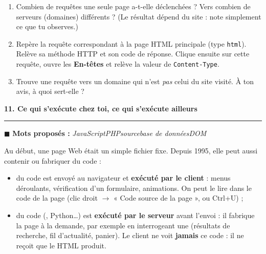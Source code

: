 \documentclass[11pt,a4paper]{article}
\newif\ifprof
\newcommand{\sect}[1]{%
  \par\addvspace{10pt}%
  {\color{navy}\Large\bfseries #1\par}\vspace{3pt}%
  {\color{navy}\hrule height 0.6pt}\vspace{6pt}}
\newcommand{\trou}[2][3cm]{\ifprof\textcolor{corr}{\underline{\textbf{\,#2\,}}}\else\underline{\hspace{#1}}\fi}
\newcommand{\lignes}[1]{\par\foreach \i in {1,...,#1}{\vspace{8.5mm}\hrule height 0.3pt}\vspace{2mm}}
\newcommand{\reponse}[2]{\ifprof\par{\raggedright\textcolor{corr}{#2}\par}\else\lignes{#1}\fi}
\newcommand{\motsproposes}[1]{\begin{mots}\small\textcolor{orangeT}{$\blacksquare$ \textbf{Mots proposés :}} \textit{#1}\end{mots}}
\newcommand{\ensei}[1]{\ifprof\begin{tcolorbox}[enhanced,colback=gris,colframe=corr!60,boxrule=0.5pt,arc=2pt,
  left=5pt,right=5pt,top=3pt,bottom=3pt,before skip=6pt,after skip=6pt,fontupper=\small]
  \textcolor{corr}{\textbf{Note enseignant.}} #1\end{tcolorbox}\fi}
\begin{document}
\begin{enumerate}[leftmargin=*,label=\alph*)]
\item Combien de requêtes une seule page a-t-elle déclenchées ? Vers combien de serveurs (domaines) différents ? (Le résultat dépend du site : note simplement ce que tu observes.)
\reponse{1}{Résultat variable. Ordre de grandeur : de 20 à 200 requêtes, de 3 à 30 domaines.}
\item Repère la requête correspondant à la page HTML principale (type \texttt{html}). Relève sa méthode HTTP et son code de réponse. Clique ensuite sur cette requête, ouvre les \textbf{En-têtes} et relève la valeur de \texttt{Content-Type}.
\reponse{1}{Pour la page principale du site proposé : généralement GET, \texttt{200} et \texttt{text/html} (éventuellement suivi de \texttt{charset=utf-8}). Les valeurs peuvent varier.}
\item Trouve une requête vers un domaine qui n'est \emph{pas} celui du site visité. À ton avis, à quoi sert-elle ?
\reponse{2}{Requêtes « tierces » : publicité, mesure d'audience, polices de caractères, vidéos intégrées, réseaux de diffusion de contenu (CDN).}
\end{enumerate}

\ensei{Présenter ces résultats comme des variables, sans valeur attendue : elles changent d'un site, d'un navigateur et d'un jour à l'autre. Les requêtes tierces préparent la section sur les cookies tiers (livret 4) et renvoient au modèle économique vu au chapitre sur les réseaux sociaux.}

\sect{11. Ce qui s'exécute chez toi, ce qui s'exécute ailleurs}

\motsproposes{JavaScript\enspace\textbullet\enspace PHP\enspace\textbullet\enspace source\enspace\textbullet\enspace base de données\enspace\textbullet\enspace DOM}

Au début, une page Web était un simple fichier fixe. Depuis 1995, elle peut aussi contenir ou fabriquer du code :
\begin{itemize}
\item du code \trou[2.5cm]{JavaScript} est envoyé au navigateur et \textbf{exécuté par le client} : menus déroulants, vérification d'un formulaire, animations. On peut le lire dans le code \trou[2cm]{source} de la page (clic droit $\to$ « Code source de la page », ou Ctrl+U) ;
\item du code (\trou[1.5cm]{PHP}, Python…) est \textbf{exécuté par le serveur} avant l'envoi : il fabrique la page à la demande, par exemple en interrogeant une \trou[3cm]{base de données} (résultats de recherche, fil d'actualité, panier). Le client ne voit \textbf{jamais} ce code : il ne reçoit que le HTML produit.
\end{itemize}
\end{document}

